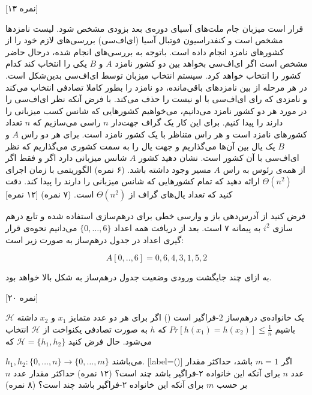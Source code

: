 





\medskip

[۱۳ نمره]

قرار است میزبان جام ملت‌های آسیای دوره‌ی بعد بزودی مشخص شود.  لیست نامزدها مشخص است و کنفدراسیون فوتبال آسیا (ای‌اف‌سی) بررسی‌های  لازم خود را از کشورهای نامزد  انجام داده است. باتوجه به بررسی‌های انجام شده، درحال حاضر مشخص است اگر ای‌اف‌سی بخواهد بین دو   کشور نامزد $A$ و $B$ یکی را انتخاب کند کدام کشور را انتخاب خواهد کرد. سیستم انتخاب میزبان توسط ای‌اف‌سی بدین‌شکل است. در هر مرحله از بین نامزدهای باقی‌مانده، دو  نامزد را بطور کاملا تصادفی انتخاب می‌کند و نامزدی که رای ای‌اف‌سی با او نیست را حذف می‌کند. با فرض آنکه نظر ای‌اف‌سی را در مورد هر دو کشور نامزد می‌دانیم، می‌خواهیم کشورهایی که شانس کسب میزبانی را دارند را پیدا کنیم.  برای این کار یک گراف جهت‌دار $n$ راسی  می‌سازیم که $n$ تعداد کشورهای نامزد است و هر راس متناظر با یک کشور نامزد است. برای هر دو راس $A$ و $B$ یک یال بین آن‌ها می‌گذاریم و جهت یال را به سمت کشوری می‌گذاریم که نظر ای‌اف‌سی با آن کشور است. 
 نشان دهید کشور $A$ شانس میزبانی دارد اگر و فقط اگر از همه‌ی رئوس به راس $A$ مسیر وجود داشته باشد. (۶ نمره)
 الگوریتمی با زمان اجرای $\Theta(n^2)$ ارائه دهید که تمام کشورهایی که شانس میزبانی را دارند را پیدا کند. دقت کنید که تعداد یال‌های گراف از  $\Theta(n^2)$ است. (۷ نمره)
 [۱۲ نمره]
 
 فرض کنید از آدرس‌دهی باز و وارسی خطی برای درهم‌سازی استفاده شده  و تابع درهم سازی $i^2$ به پیمانه ۷ است. بعد از دریافت همه اعداد
  $\{0,\dots, 6\}$ می‌دانیم نحوه‌ی قرار گیری اعداد در جدول درهم‌ساز به صورت زیر است:
 
 $$A[0,..,6] = 0,6, 4, 3, 1,5,2$$
 
 به ازای چند جایگشت ورودی وضعیت جدول درهم‌ساز به شکل بالا خواهد بود.
 
 
 [۲۰ نمره]

$ \mathcal{H} $
یک خانواده‌ی درهم‌ساز $ 2 $-فراگیر است () اگر برای هر دو عدد متمایز $ x_1 $ و $ x_2 $ داشته باشیم
$ Pr[h(x_1) = h(x_2)]  \leq \frac{1}{n}$
که $ h $ به صورت تصادفی یکنواخت از $ \mathcal{H} $ انتخاب می‌شود.
حال فرض کنید
$ \mathcal{H} = \{h_1, h_2\} $
که

$ h_1, h_2: \{0, \dots, n\} \rightarrow \{0, \dots, m\} $ 
می‌باشند.
[label=(\alph*)]
 اگر $ m = 1 $ باشد، حداکثر مقدار عدد $ n $ برای آنکه این خانواده ۲-فراگیر باشد چند است؟ (۱۲ نمره)
 حداکثر مقدار عدد $ n $ بر حسب $ m $ برای آنکه این خانواده ۲-فراگیر باشد چند است؟ (۸ نمره) 

